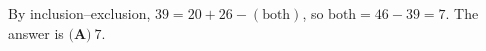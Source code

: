 By inclusion--exclusion, $39=20+26-(\text{both})$, so $\text{both}=46-39=7$. The answer is $\boxed{\textbf{(A)}\ 7}$.
